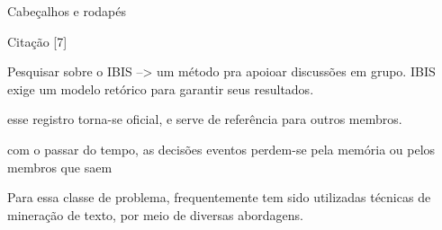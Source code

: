   Cabeçalhos e rodapés







Citação [7]

Pesquisar sobre o IBIS --> um método pra apoioar discussões em grupo.
IBIS exige um modelo retórico para garantir seus resultados.

 esse registro torna-se oficial, e serve de referência para outros membros. 

 com o passar do tempo, as decisões eventos perdem-se pela memória ou pelos membros que saem



Para essa classe de problema, frequentemente tem sido utilizadas técnicas de mineração de texto, por meio de diversas abordagens.  


